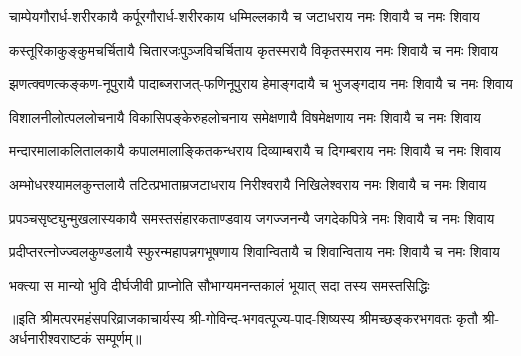 

\fourlineindentedshloka
{चाम्पेयगौरार्ध-शरीरकायै}
{कर्पूरगौरार्ध-शरीरकाय}
{धम्मिल्लकायै च जटाधराय}
{नमः शिवायै च नमः शिवाय}

\fourlineindentedshloka
{कस्तूरिकाकुङ्कुमचर्चितायै}
{चितारजःपुञ्जविचर्चिताय}
{कृतस्मरायै विकृतस्मराय}
{नमः शिवायै च नमः शिवाय}

\fourlineindentedshloka
{झणत्क्वणत्कङ्कण-नूपुरायै}
{पादाब्जराजत्-फणिनूपुराय}
{हेमाङ्गदायै च भुजङ्गदाय}
{नमः शिवायै च नमः शिवाय}

\fourlineindentedshloka
{विशालनीलोत्पललोचनायै}
{विकासिपङ्केरुहलोचनाय}
{समेक्षणायै विषमेक्षणाय}
{नमः शिवायै च नमः शिवाय}

\fourlineindentedshloka
{मन्दारमालाकलितालकायै}
{कपालमालाङ्कितकन्धराय}
{दिव्याम्बरायै च दिगम्बराय}
{नमः शिवायै च नमः शिवाय}

\fourlineindentedshloka
{अम्भोधरश्यामलकुन्तलायै}
{तटित्प्रभाताम्रजटाधराय}
{निरीश्वरायै निखिलेश्वराय}
{नमः शिवायै च नमः शिवाय}

\fourlineindentedshloka
{प्रपञ्चसृष्ट्युन्मुखलास्यकायै}
{समस्तसंहारकताण्डवाय}
{जगज्जनन्यै जगदेकपित्रे}
{नमः शिवायै च नमः शिवाय}

\fourlineindentedshloka
{प्रदीप्तरत्नोज्ज्वलकुण्डलायै}
{स्फुरन्महापन्नगभूषणाय}
{शिवान्वितायै च शिवान्विताय}
{नमः शिवायै च नमः शिवाय}

{भक्त्या स मान्यो भुवि दीर्घजीवी}
{प्राप्नोति सौभाग्यमनन्तकालं}
{भूयात् सदा तस्य समस्तसिद्धिः}

॥इति श्रीमत्परमहंसपरिव्राजकाचार्यस्य श्री-गोविन्द-भगवत्पूज्य-पाद-शिष्यस्य श्रीमच्छङ्करभगवतः कृतौ श्री-अर्धनारीश्वराष्टकं सम्पूर्णम्॥

